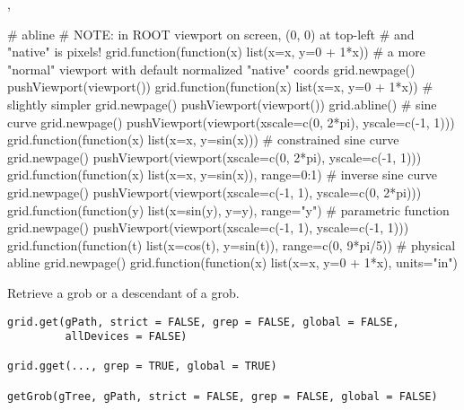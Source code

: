 %
\begin{SeeAlso}\relax
{},
\end{SeeAlso}
%
\begin{Examples}
\begin{ExampleCode}
    # abline
    # NOTE: in ROOT viewport on screen, (0, 0) at top-left
    #       and "native" is pixels!
    grid.function(function(x) list(x=x, y=0 + 1*x))
    # a more "normal" viewport with default normalized "native" coords
    grid.newpage()
    pushViewport(viewport())
    grid.function(function(x) list(x=x, y=0 + 1*x))
    # slightly simpler
    grid.newpage()
    pushViewport(viewport())
    grid.abline()
    # sine curve
    grid.newpage()
    pushViewport(viewport(xscale=c(0, 2*pi), yscale=c(-1, 1)))
    grid.function(function(x) list(x=x, y=sin(x)))
    # constrained sine curve
    grid.newpage()
    pushViewport(viewport(xscale=c(0, 2*pi), yscale=c(-1, 1)))
    grid.function(function(x) list(x=x, y=sin(x)),
                  range=0:1)
    # inverse sine curve
    grid.newpage()
    pushViewport(viewport(xscale=c(-1, 1), yscale=c(0, 2*pi)))
    grid.function(function(y) list(x=sin(y), y=y),
                  range="y")
    # parametric function
    grid.newpage()
    pushViewport(viewport(xscale=c(-1, 1), yscale=c(-1, 1)))
    grid.function(function(t) list(x=cos(t), y=sin(t)),
                  range=c(0, 9*pi/5))
    # physical abline
    grid.newpage()
    grid.function(function(x) list(x=x, y=0 + 1*x),
                  units="in")
\end{ExampleCode}
\end{Examples}
%
\begin{Description}\relax
Retrieve a grob or a descendant of a grob.
\end{Description}
%
\begin{Usage}
\begin{verbatim}
grid.get(gPath, strict = FALSE, grep = FALSE, global = FALSE,
         allDevices = FALSE)

grid.gget(..., grep = TRUE, global = TRUE)

getGrob(gTree, gPath, strict = FALSE, grep = FALSE, global = FALSE) 
\end{verbatim}
\end{Usage}
%
